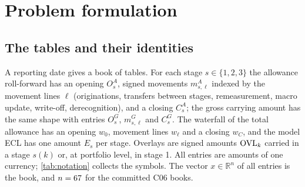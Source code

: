 \section{Problem formulation}
\label{sec:problem}

\subsection{The tables and their identities}
\label{sec:problem-tables}

A reporting date gives a book of tables.
For each stage $s\in\{1,2,3\}$ the allowance roll-forward has an opening $O^{A}_{s}$, signed movements $m^{A}_{s,\ell}$ indexed by the movement lines $\ell$ (originations, transfers between stages, remeasurement, macro update, write-off, derecognition), and a closing $C^{A}_{s}$; the gross carrying amount has the same shape with entries $O^{G}_{s}$, $m^{G}_{s,\ell}$ and $C^{G}_{s}$.
The waterfall of the total allowance has an opening $w_0$, movement lines $w_\ell$ and a closing $w_C$, and the model ECL has one amount $E_s$ per stage.
Overlays are signed amounts $\mathrm{OVL}_k$ carried in a stage $s(k)$ or, at portfolio level, in stage 1.
All entries are amounts of one currency; \cref{tab:notation} collects the symbols.
The vector $x\in\mathbb{R}^{n}$ of all entries is the book, and $n=67{}$ for the committed C06 books.

